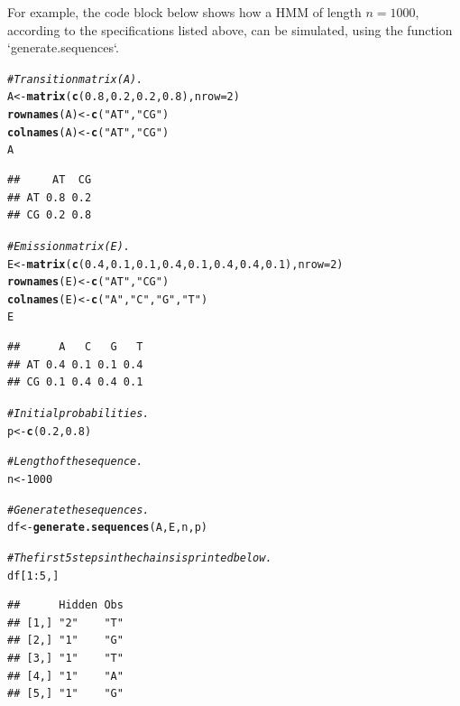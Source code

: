 \documentclass{article}\usepackage[]{graphicx}\usepackage[]{color}
\makeatletter
\newcommand{\hlnum}[1]{\textcolor[rgb]{0.686,0.059,0.569}{#1}}%
\newcommand{\hlstr}[1]{\textcolor[rgb]{0.192,0.494,0.8}{#1}}%
\newcommand{\hlcom}[1]{\textcolor[rgb]{0.678,0.584,0.686}{\textit{#1}}}%
\newcommand{\hlopt}[1]{\textcolor[rgb]{0,0,0}{#1}}%
\newcommand{\hlstd}[1]{\textcolor[rgb]{0.345,0.345,0.345}{#1}}%
\newcommand{\hlkwb}[1]{\textcolor[rgb]{0.69,0.353,0.396}{#1}}%
\newcommand{\hlkwc}[1]{\textcolor[rgb]{0.333,0.667,0.333}{#1}}%
\newcommand{\hlkwd}[1]{\textcolor[rgb]{0.737,0.353,0.396}{\textbf{#1}}}%
\newenvironment{kframe}{%
 \def\at@end@of@kframe{}%
 \ifinner\ifhmode%
  \def\at@end@of@kframe{\end{minipage}}%
  \begin{minipage}{\columnwidth}%
 \fi\fi%
 \def\FrameCommand##1{\hskip\@totalleftmargin \hskip-\fboxsep
 \colorbox{shadecolor}{##1}\hskip-\fboxsep
     \hskip-\linewidth \hskip-\@totalleftmargin \hskip\columnwidth}%
 \MakeFramed {\advance\hsize-\width
   \@totalleftmargin\z@ \linewidth\hsize
   \@setminipage}}%
 {\par\unskip\endMakeFramed%
 \at@end@of@kframe}
\newenvironment{knitrout}{}{} %
\makeatother
\begin{document}
For example, the code block below shows how a HMM of length $n = 1000$, according to the specifications listed above, can be simulated, using the function `generate.sequences`.

\begin{knitrout}
\color{fgcolor}\begin{kframe}
\begin{alltt}
\hlcom{# Transition matrix (A).}
\hlstd{A} \hlkwb{<-} \hlkwd{matrix}\hlstd{(}\hlkwd{c}\hlstd{(}\hlnum{0.8}\hlstd{,} \hlnum{0.2}\hlstd{,} \hlnum{0.2}\hlstd{,} \hlnum{0.8}\hlstd{),} \hlkwc{nrow} \hlstd{=} \hlnum{2}\hlstd{)}
\hlkwd{rownames}\hlstd{(A)} \hlkwb{<-} \hlkwd{c}\hlstd{(}\hlstr{"AT"}\hlstd{,} \hlstr{"CG"}\hlstd{)}
\hlkwd{colnames}\hlstd{(A)} \hlkwb{<-} \hlkwd{c}\hlstd{(}\hlstr{"AT"}\hlstd{,} \hlstr{"CG"}\hlstd{)}
\hlstd{A}
\end{alltt}
\begin{verbatim}
##     AT  CG
## AT 0.8 0.2
## CG 0.2 0.8
\end{verbatim}
\begin{alltt}
\hlcom{# Emission matrix (E).}
\hlstd{E} \hlkwb{<-} \hlkwd{matrix}\hlstd{(}\hlkwd{c}\hlstd{(}\hlnum{0.4}\hlstd{,} \hlnum{0.1}\hlstd{,} \hlnum{0.1}\hlstd{,} \hlnum{0.4}\hlstd{,} \hlnum{0.1}\hlstd{,} \hlnum{0.4}\hlstd{,} \hlnum{0.4}\hlstd{,} \hlnum{0.1}\hlstd{),} \hlkwc{nrow} \hlstd{=} \hlnum{2}\hlstd{)}
\hlkwd{rownames}\hlstd{(E)} \hlkwb{<-} \hlkwd{c}\hlstd{(}\hlstr{"AT"}\hlstd{,} \hlstr{"CG"}\hlstd{)}
\hlkwd{colnames}\hlstd{(E)} \hlkwb{<-} \hlkwd{c}\hlstd{(}\hlstr{"A"}\hlstd{,} \hlstr{"C"}\hlstd{,} \hlstr{"G"}\hlstd{,} \hlstr{"T"}\hlstd{)}
\hlstd{E}
\end{alltt}
\begin{verbatim}
##      A   C   G   T
## AT 0.4 0.1 0.1 0.4
## CG 0.1 0.4 0.4 0.1
\end{verbatim}
\begin{alltt}
\hlcom{# Initial probabilities.}
\hlstd{p} \hlkwb{<-} \hlkwd{c}\hlstd{(}\hlnum{0.2}\hlstd{,}\hlnum{0.8}\hlstd{)}

\hlcom{# Length of the sequence.}
\hlstd{n} \hlkwb{<-} \hlnum{1000}

\hlcom{# Generate the sequences. }
\hlstd{df} \hlkwb{<-} \hlkwd{generate.sequences}\hlstd{(A, E, n, p)}

\hlcom{# The first 5 steps in the chains is printed below. }
\hlstd{df[}\hlnum{1}\hlopt{:}\hlnum{5}\hlstd{, ]}
\end{alltt}
\begin{verbatim}
##      Hidden Obs
## [1,] "2"    "T"
## [2,] "1"    "G"
## [3,] "1"    "T"
## [4,] "1"    "A"
## [5,] "1"    "G"
\end{verbatim}
\end{kframe}
\end{knitrout}
\end{document}
